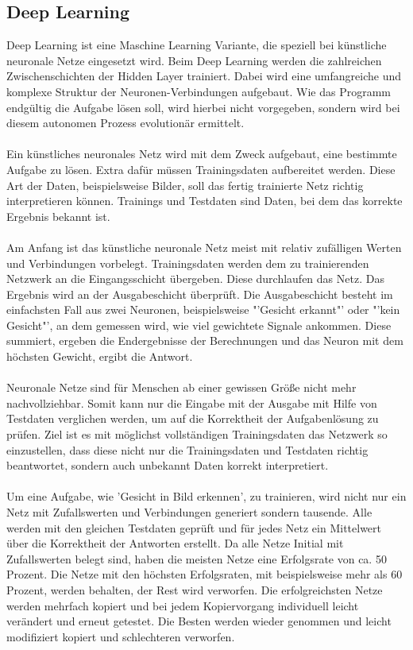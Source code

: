 \documentclass[12pt,oneside,a4paper,parskip]{scrbook}
\begin{document}
\subsection{Deep Learning}
Deep Learning ist eine Maschine Learning Variante, die speziell bei künstliche neuronale Netze eingesetzt wird. Beim Deep Learning werden die zahlreichen Zwischenschichten der Hidden Layer trainiert. Dabei wird eine umfangreiche und komplexe Struktur der Neuronen-Verbindungen aufgebaut. Wie das Programm endgültig die Aufgabe lösen soll, wird hierbei nicht vorgegeben, sondern wird bei diesem autonomen Prozess evolutionär ermittelt. 
\\\\
Ein künstliches neuronales Netz wird mit dem Zweck aufgebaut, eine bestimmte Aufgabe zu lösen. Extra dafür müssen Trainingsdaten aufbereitet werden. Diese Art der Daten, beispielsweise Bilder, soll das fertig trainierte Netz richtig interpretieren können. Trainings und Testdaten sind Daten, bei dem das korrekte Ergebnis bekannt ist.
\\\\
Am Anfang ist das künstliche neuronale Netz meist mit relativ zufälligen Werten und Verbindungen vorbelegt. Trainingsdaten werden dem zu trainierenden Netzwerk an die Eingangsschicht übergeben. Diese durchlaufen das Netz. Das Ergebnis wird an der Ausgabeschicht überprüft. Die Ausgabeschicht besteht im einfachsten Fall aus zwei Neuronen, beispielsweise "'Gesicht erkannt"' oder "'kein Gesicht"', an dem gemessen wird, wie viel gewichtete Signale ankommen. Diese summiert, ergeben die Endergebnisse der Berechnungen und das Neuron mit dem höchsten Gewicht, ergibt die Antwort.
\\\\
Neuronale Netze sind für Menschen ab einer gewissen Größe nicht mehr nachvollziehbar. Somit kann nur die Eingabe mit der Ausgabe mit Hilfe von Testdaten verglichen werden, um auf die Korrektheit der Aufgabenlösung zu prüfen. Ziel ist es mit möglichst vollständigen Trainingsdaten das Netzwerk so einzustellen, dass diese nicht nur die Trainingsdaten und Testdaten richtig beantwortet, sondern auch unbekannt Daten korrekt interpretiert.
\\\\
Um eine Aufgabe, wie 'Gesicht in Bild erkennen', zu trainieren, wird nicht nur ein Netz mit Zufallswerten und Verbindungen generiert sondern tausende. Alle werden mit den gleichen Testdaten geprüft und für jedes Netz ein Mittelwert über die Korrektheit der Antworten erstellt. Da alle Netze Initial mit Zufallswerten belegt sind, haben die meisten Netze eine Erfolgsrate von ca. 50 Prozent. Die Netze mit den höchsten Erfolgsraten, mit beispielsweise mehr als 60 Prozent, werden behalten, der Rest wird verworfen. Die erfolgreichsten Netze werden mehrfach kopiert und bei jedem Kopiervorgang individuell leicht verändert und erneut getestet. Die Besten werden wieder genommen und leicht modifiziert kopiert und schlechteren verworfen.
\end{document}

